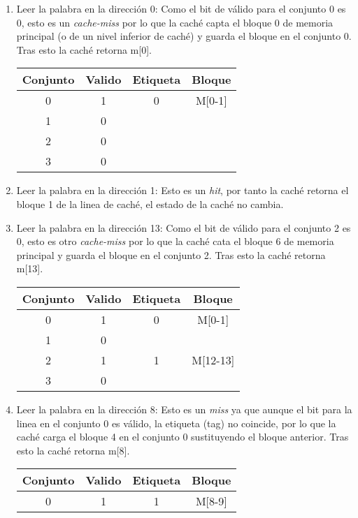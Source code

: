 \begin{ejemplo}
\begin{enumerate}
    \item Leer la palabra en la dirección 0: Como el bit de válido para el conjunto 0 es 0, esto es un \textit{cache-miss} por lo que la caché capta el bloque 0 de memoria principal (o de un nivel inferior de caché) y guarda el 
        bloque en el conjunto 0. Tras esto la caché retorna m[0]. 
\begin{center}
\begin{tabular}{cccc}
    Conjunto & Valido & Etiqueta & Bloque \\
    \hline
    0 & 1 & 0 & M[0-1] \\
    1 & 0 & & \\
    2 & 0 & & \\
    3 & 0 & & \\
\end{tabular}
\end{center}
\item Leer la palabra en la dirección 1: Esto es un \textit{hit}, por tanto la caché retorna el bloque 1 de la linea de caché, el estado de la caché no cambia.
\item Leer la palabra en la dirección 13: Como el bit de válido para el conjunto 2 es 0, esto es otro \textit{cache-miss} por lo que la caché cata el bloque 6 de memoria principal y guarda el bloque en el conjunto 2. Tras esto la caché retorna m[13].
\begin{center}
\begin{tabular}{cccc}
    Conjunto & Valido & Etiqueta & Bloque \\
    \hline
    0 & 1 & 0 & M[0-1] \\
    1 & 0 & & \\
    2 & 1 & 1 & M[12-13] \\
    3 & 0 & & \\
\end{tabular}
\end{center}
\item Leer la palabra en la dirección 8: Esto es un \textit{miss} ya que aunque el bit para la linea en el conjunto 0 es válido, la etiqueta (tag) no coincide, por lo que la caché carga el bloque 4 en el conjunto 0 sustituyendo el bloque
    anterior. Tras esto la caché retorna m[8].
        \begin{center}
\begin{tabular}{cccc}
    Conjunto & Valido & Etiqueta & Bloque \\
    \hline
    0 & 1 & 1 & M[8-9] \\

\end{tabular}
\end{center}
\end{enumerate}
\end{ejemplo}
